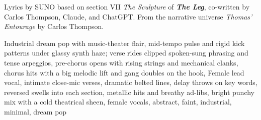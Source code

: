 
\begin{notes}
Lyrics by SUNO based on section VII \emph{The Sculpture} of \emph{\bfseries The Leg}, %
co-written by Carlos Thompson, Claude, and ChatGPT. %
From the narrative universe \emph{Thomas’ Entourage} by Carlos Thompson.
\end{notes}
\begin{style}
Industrial dream pop with music-theater flair, mid-tempo pulse and rigid kick patterns under glassy synth haze; verse rides clipped spoken-sung phrasing and tense arpeggios, pre-chorus opens with rising strings and mechanical clanks, chorus hits with a big melodic lift and gang doubles on the hook, Female lead vocal, intimate close-mic verses, dramatic belted lines, delay throws on key words, reversed swells into each section, metallic hits and breathy ad-libs, bright punchy mix with a cold theatrical sheen, female vocals, abstract, faint, industrial, minimal, dream pop
\end{style}
